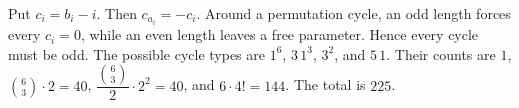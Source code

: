 Put $c_i=b_i-i$. Then $c_{a_i}=-c_i$. Around a permutation cycle, an odd length forces every $c_i=0$, while an even length leaves a free parameter. Hence every cycle must be odd. The possible cycle types are $1^6$, $3\,1^3$, $3^2$, and $5\,1$. Their counts are $1$, $\binom63\cdot2=40$, $\dfrac{\binom63}{2}\cdot2^2=40$, and $6\cdot4!=144$. The total is $\boxed{225}$.

